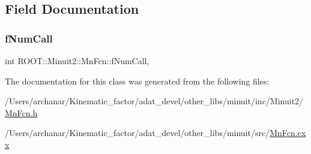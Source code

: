 \subsection{Field Documentation}
\mbox{\label{classROOT_1_1Minuit2_1_1MnFcn_a5a9224bf6024caf935f26488ed112e10}} 
\subsubsection{\texorpdfstring{fNumCall}{fNumCall}}
{\footnotesize\ttfamily int R\+O\+O\+T\+::\+Minuit2\+::\+Mn\+Fcn\+::f\+Num\+Call\hspace{0.3cm}{\ttfamily [mutable]}, {\ttfamily [protected]}}



The documentation for this class was generated from the following files\+:\begin{DoxyCompactItemize}
\item 
/\+Users/archanar/\+Kinematic\+\_\+factor/adat\+\_\+devel/other\+\_\+libs/minuit/inc/\+Minuit2/\mbox{\hyperlink{other__libs_2minuit_2inc_2Minuit2_2MnFcn_8h}{Mn\+Fcn.\+h}}\item 
/\+Users/archanar/\+Kinematic\+\_\+factor/adat\+\_\+devel/other\+\_\+libs/minuit/src/\mbox{\hyperlink{MnFcn_8cxx}{Mn\+Fcn.\+cxx}}\end{DoxyCompactItemize}
